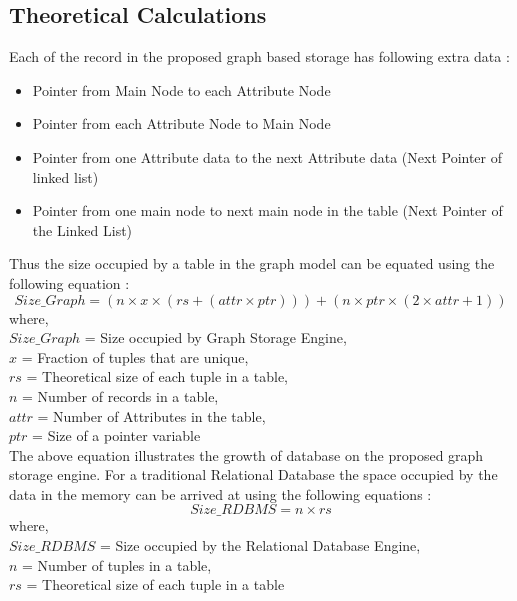 \documentclass[12pt, oneside]{book}
\begin{document}
\subsection{Theoretical Calculations}
Each of the record in the proposed graph based storage has following extra data :
\begin{itemize}
 \item Pointer from Main Node to each Attribute Node
 \item Pointer from each Attribute Node to Main Node
 \item Pointer from one Attribute data to the next Attribute data (Next Pointer of linked list)
 \item Pointer from one main node to next main node in the table (Next Pointer of the Linked List)
\end{itemize}
Thus the size occupied by a table in the graph model can be equated using the following equation :
\begin{equation}
  Size\_Graph = (n \times x \times (rs + (attr \times ptr)) ) + (n \times ptr \times (2 \times attr + 1))
  \label{grsize}
\end{equation}
where, \\
$Size\_Graph$ = Size occupied by Graph Storage Engine, \\
$x$ = Fraction of tuples that are unique, \\
$rs$ = Theoretical size of each tuple in a table, \\
$n$ = Number of records in a table, \\
$attr$ = Number of Attributes in the table, \\
$ptr$ = Size of a pointer variable \\

The above equation illustrates the growth of database on the proposed graph storage engine. For a traditional Relational Database the space occupied by the data in the memory can be arrived at using the following equations :
\begin{equation}
 Size\_RDBMS = n \times rs
 \label{rdbmssize}
\end{equation}
where, \\
$Size\_RDBMS$ = Size occupied by the Relational Database Engine, \\
$n$ = Number of tuples in a table, \\
$rs$ = Theoretical size of each tuple in a table \\
\end{document}

